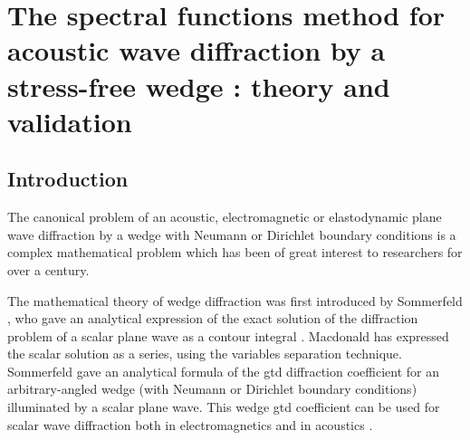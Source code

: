 \chapter[][Acoustic Case]{The spectral functions method for acoustic wave diffraction by a stress-free
wedge : theory and validation}
\label{chap-developpement}


\section{Introduction}
The canonical problem of an acoustic, electromagnetic or elastodynamic plane wave diffraction by a wedge with Neumann or Dirichlet boundary conditions is a complex mathematical problem which has been of great interest to researchers for over a century.

The mathematical theory of wedge diffraction was first introduced by Sommerfeld \cite{Sommerfeld}, who gave an analytical expression of the exact solution of the diffraction problem of a scalar plane wave as a contour integral \cite{SMtechnique}. Macdonald \cite{Macdo} has expressed the scalar solution as a series, using the variables separation technique. Sommerfeld \cite{Sommerfeld} gave an analytical formula of the \acrfull{gtd} diffraction coefficient for an arbitrary-angled wedge (with Neumann or Dirichlet boundary conditions) illuminated by a scalar plane wave. This wedge \acrshort{gtd} coefficient can be used for scalar wave diffraction both in electromagnetics \cite{Kouyoumjian} and in acoustics \cite{Bouche,Bo}.

